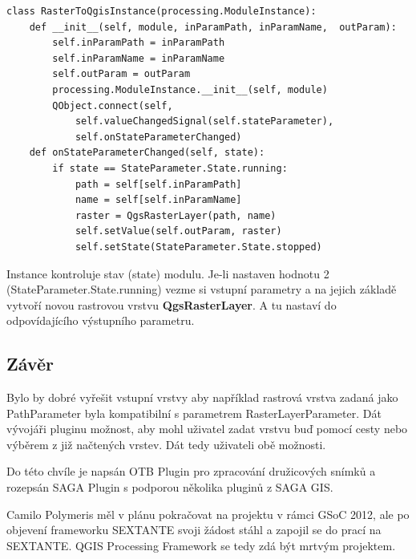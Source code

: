 \begin{lstlisting}[caption={Třída RasterToQgisInstance reprezentující instanci modulu pro QGIS Processing Framework}, label=pf:rasterToQgisInstance, morekeywords={processing.ModuleInstance, RasterToQgisInstance, __init__, valueChangedSignal,onStateParameterChanged, QgsRasterLayer,setValue }]
class RasterToQgisInstance(processing.ModuleInstance):
    def __init__(self, module, inParamPath, inParamName,  outParam):
        self.inParamPath = inParamPath
        self.inParamName = inParamName
        self.outParam = outParam
        processing.ModuleInstance.__init__(self, module)
        QObject.connect(self,
            self.valueChangedSignal(self.stateParameter),
            self.onStateParameterChanged)
    def onStateParameterChanged(self, state):
        if state == StateParameter.State.running:            
            path = self[self.inParamPath]
            name = self[self.inParamName]
            raster = QgsRasterLayer(path, name)
            self.setValue(self.outParam, raster)
            self.setState(StateParameter.State.stopped)
\end{lstlisting}

Instance kontroluje stav (state) modulu. Je-li nastaven hodnotu 2
(StateParameter.State.running) vezme si vstupní parametry a na jejich
základě vytvoří novou rastrovou vrstvu \textbf{QgsRasterLayer}. A tu
nastaví do odpovídajícího výstupního parametru.


\subsection{Závěr}

Bylo by dobré vyřešit vstupní vrstvy aby například rastrová vrstva
zadaná jako PathParameter byla kompatibilní s parametrem
RasterLayerParameter. Dát vývojáři pluginu možnost, aby mohl uživatel
zadat vrstvu buď pomocí cesty nebo výběrem z již načtených vrstev. Dát
tedy uživateli obě možnosti.

Do této chvíle je napsán OTB Plugin pro zpracování družicových snímků
a rozepsán SAGA Plugin s podporou několika pluginů z SAGA GIS.

Camilo Polymeris měl v plánu pokračovat na projektu v rámci GSoC 2012,
ale po objevení frameworku SEXTANTE svoji žádost stáhl a zapojil se do
prací na SEXTANTE. QGIS Processing Framework se tedy zdá být mrtvým
projektem.

